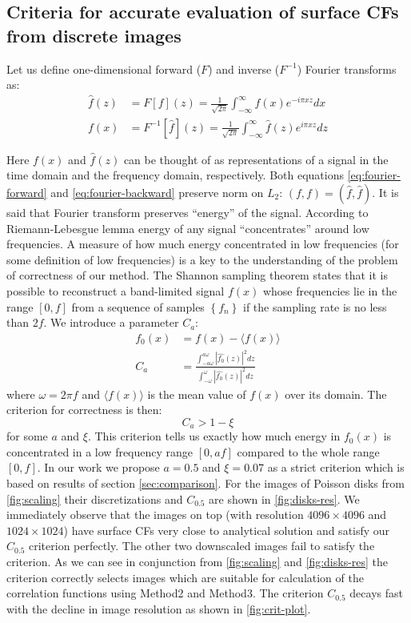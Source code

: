 \documentclass[reprint,amsmath,amssymb,aps,pre]{revtex4-1}
\begin{document}
\subsection{Criteria for accurate evaluation of surface CFs from discrete images}
\label{sec:crit}
Let us define one-dimensional forward ($F$) and inverse ($F^{-1}$) Fourier
transforms as:
\begin{align}
  \hat{f}(z) &= F[f](z) = \frac{1}{\sqrt{2\pi}}\int_{-\infty}^{\infty} f(x)
  e^{-i\pi xz} dx \label{eq:fourier-forward} \\
  f(x) &= F^{-1}[\hat{f}](z) = \frac{1}{\sqrt{2\pi}}\int_{-\infty}^{\infty} \hat{f}(z)
  e^{i\pi xz} dz \label{eq:fourier-backward}
\end{align}

Here $f(x)$ and $\hat{f}(z)$ can be thought of as representations of a signal in
the time domain and the frequency domain, respectively. Both equations
\cref{eq:fourier-forward} and \cref{eq:fourier-backward} preserve norm on $L_2$:
$(f, f) = (\hat{f}, \hat{f})$. It is said that Fourier transform preserves
``energy'' of the signal. According to Riemann-Lebesgue lemma \cite{bookHilb}
energy of any signal ``concentrates'' around low frequencies. A measure of how
much energy concentrated in low frequencies (for some definition of low
frequencies) is a key to the understanding of the problem of correctness of our
method. The Shannon sampling theorem \cite{bookHilb} states that it is possible
to reconstruct a band-limited signal $f(x)$ whose frequencies lie in the range
$[0, f]$ from a sequence of samples $\left\{f_n\right\}$ if the sampling rate is
no less than $2f$. We introduce a parameter $C_a$:
\begin{align*}
  f_0(x) &= f(x) - \langle f(x) \rangle \\
  C_a &= \frac{\int_{-a\omega}^{a\omega} |\hat{f_0}(z)|^2 dz}{\int_{-\omega}^{\omega} |\hat{f_0}(z)|^2 dz}
\end{align*}
where $\omega = 2\pi f$ and $\langle f(x) \rangle$ is the mean value of $f(x)$
over its domain. The criterion for correctness is then:
\begin{equation*}
  C_a > 1 - \xi
\end{equation*}
for some $a$ and $\xi$. This criterion tells us exactly how much energy in
$f_0(x)$ is concentrated in a low frequency range $[0, af]$ compared to the
whole range $[0, f]$. In our work we propose $a = 0.5$ and $\xi = 0.07$ as
a strict criterion which is based on results of section
\cref{sec:comparison}. For the images of Poisson disks from \cref{fig:scaling}
their discretizations and $C_{0.5}$ are shown in \cref{fig:disks-res}. We
immediately observe that the images on top (with resolution $4096 \times 4096$
and $1024 \times 1024$) have surface CFs very close to analytical solution and
satisfy our  $C_{0.5}$ criterion perfectly. The other two downscaled images fail
to satisfy the criterion. As we can see in conjunction from \cref{fig:scaling}
and \cref{fig:disks-res} the criterion correctly selects images which are
suitable for calculation of the correlation functions using Method2 and
Method3. The criterion $C_{0.5}$ decays fast with the decline in image
resolution as shown in \cref{fig:crit-plot}.
\end{document}
